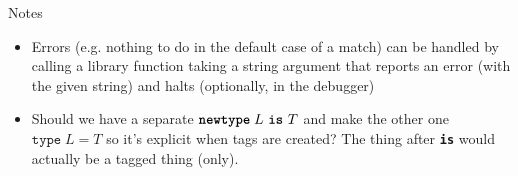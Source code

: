 \documentclass{article}
\newcommand{\keyw}[1]{\texttt{\textbf{#1}}}
\begin{document}
Notes

\begin{itemize}

\item Errors (e.g. nothing to do in the default case of a match) can be handled by calling a library function taking a string argument that reports an error (with the given string) and halts (optionally, in the debugger)

\item Should we have a separate $\keyw{newtype} \; L~\keyw{is}~T$ and make the other one $\texttt{type} \; L = T$ so it's explicit when tags are created?  The thing after \keyw{is} would actually be a tagged thing (only).
\end{itemize}




\end{document}
